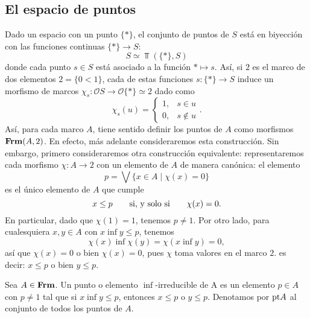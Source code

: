 \documentclass{comunicaciones}
\begin{document}
\subsection{El espacio de puntos}
Dado un espacio con un punto $\{*\}$, el conjunto de
puntos de $S$ está en biyección con las funciones continuas
$\{*\}\to S$:
\[
  S \simeq \Top(\{*\},S)
\]
donde cada punto $s\in S$ está asociado a la función $*\mapsto
s$.
Así, si $2$ es el marco de dos elementos $2=\{0<1\}$,
cada de estas funciones $s:\{*\}\to S$ induce un morfismo de
marcos $\chi_s:\mathcal{O}S\to\mathcal{O}\{*\}\simeq 2$ dado como
\[
  \chi_s(u) =
  \begin{cases}
    1, & s\in u \\
    0, & s\notin u
  \end{cases}
.\]
Así, para cada marco $A$, tiene sentido definir los puntos de $A$
como morfismos $\mathbf{Frm}(A,2)$.
En efecto, más adelante consideraremos esta construcción.
Sin embargo, primero consideraremos otra construcción equivalente:
representaremos cada morfismo $\chi:A\to 2$ con un elemento de
$A$ de manera canónica: el elemento
\[
    p = \bigvee\{x\in A\mid \chi(x)=0\}
\]
es el único elemento de $A$ que cumple
\[
    x\leq p \qquad\text{si, y solo si}\qquad \chi(x) = 0
.\]
En particular, dado que $\chi(1)=1$, tenemos $p\neq 1$.
Por otro lado, para cualesquiera $x,y\in A$ con
$x\inf y\leq p$, tenemos
\[
    \chi(x)\inf\chi(y)=\chi(x\inf y)=0
,\]
así que $\chi(x)=0$ o bien $\chi(x)=0$, pues $\chi$ toma valores
en el marco $2$. es decir: $x\leq p$ o bien $y\leq p$.

\begin{dfn}
  Sea $A\in \mathbf{Frm}$. Un punto o elemento $\inf$-irreducible 
  de A es un elemento $p\in A$ con $p\neq 1$ tal que si 
  $x\inf y\leq p$, entonces $x\leq p$ o $y\leq p$. 
  Denotamos por $\mathrm{pt} A$ al conjunto de todos los puntos de $A$.
\end{dfn}
\end{document}

